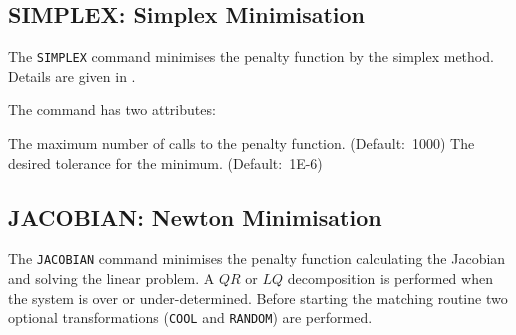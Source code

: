 \subsection{SIMPLEX: Simplex Minimisation}
\label{subsec:match-simplex}
The \texttt{SIMPLEX} command minimises the penalty function by the simplex
method. Details are given in \cite{MINUIT}.


The command has two attributes: 
\begin{madlist}
    The maximum number of calls to the penalty
   function. (Default:~1000) 
    The desired tolerance for the minimum. 
   (Default:~1E-6)
\end{madlist} 

\subsection{JACOBIAN: Newton Minimisation}
\label{subsec:match-jacobian}
The \texttt{JACOBIAN} command minimises the penalty function calculating the
Jacobian and solving the linear problem. A $Q R$ or $L Q$  decomposition is
performed when the system is over or under-determined. Before starting
the matching routine two optional transformations (\texttt{COOL} and
\texttt{RANDOM}) are performed. 


